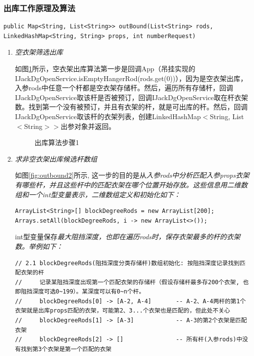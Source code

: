 \subsubsection{出库工作原理及算法}
\begin{verbatim}
public Map<String, List<String>> outBound(List<String> rods, LinkedHashMap<String, String> props, int numberRequest)
\end{verbatim}
\begin{enumerate}[leftmargin=32pt,label=\bf{步骤\Roman*.}]
	\item \it{空衣架筛选出库}\par
	如图\ref{fig:outbound1}所示，空衣架出库算法第一步是回调App（吊挂实现的IJackDgOpenService.isEmptyHangerRod(rods.get(0))），因为是空衣架出库，入参rods中任意一个杆都是空衣架存储杆。然后，遍历所有存储杆，回调IJackDgOpenService取该杆是否被预订，回调IJackDgOpenService取在杆衣架数。找到第一个没有被预订，并且有衣架的杆，就是可出库的杆。然后，回调IJackDgOpenService取该杆的衣架列表，创建LinkedHashMap$<$String, List$<$String$>>$出参对象并返回。\par
	\begin{figure}[!h]
		\centering
		\resizebox{0.8\linewidth}{!}{}
		\caption{出库算法步骤1}\label{fig:outbound1}
	\end{figure}
	\item \it{求非空衣架出库候选杆数组}\par
	如图\ref{fig:outbound2}所示, 这一步的目的是从\it{入参rods}中分析匹配\it{入参props}衣架有哪些杆，并且这些杆中的匹配衣架在哪个位置开始存放。这些信息用二维数组和一个int型变量表示，二维数组定义和初始化如下：
	\begin{lstlisting}
ArrayList<String>[] blockDegreeRods = new ArrayList[200];
Arrays.setAll(blockDegreeRods, i -> new ArrayList<>());
	\end{lstlisting}
	int型变量保存\it{最大阻挡深度}，也即在遍历rods时，保存衣架最多的杆的衣架数。举例如下：
	{\footnotesize
	\begin{verbatim}
// 2.1 blockDegreeRods(阻挡深度分类存储杆)数组初始化: 按阻挡深度记录找到匹配衣架的杆
//     记录某阻挡深度出现第一个匹配衣架的存储杆（假设存储杆最多存200个衣架, 也即阻挡深度可选0~199）。某深度可以有0~n个杆。
//     blockDegreeRods[0] -> [A-2, A-4]       -- A-2、A-4两杆的第1个衣架就是出库props匹配的衣架，可能第2、3...个衣架也是匹配的，但此处不关心
//     blockDegreeRods[1] -> [A-3]            -- A-3的第2个衣架是匹配衣架
//     blockDegreeRods[2] -> []               -- 所有杆(入参rods)中没有找到第3个衣架是第一个匹配的衣架

\end{verbatim}}
\end{enumerate}
